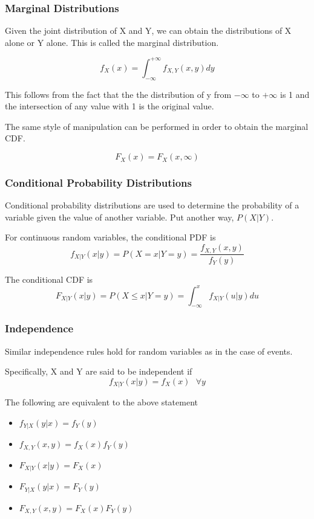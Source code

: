 \subsubsection*{Marginal Distributions}
Given the joint distribution of X and Y, we can obtain the distributions of X alone or Y alone. This is called the marginal distribution.

\[
    f_X(x) = \int_{-\infty}^{+\infty}f_{X, Y}(x, y)dy
\]

This follows from the fact that the the distribution of y from $-\infty$ to $+\infty$ is 1 and the intersection of any value with 1 is the original value. 

The same style of manipulation can be performed in order to obtain the marginal CDF.

\[
    F_X(x) = F_X(x, \infty)
\]

\subsubsection*{Conditional Probability Distributions}
Conditional probability distributions are used to determine the probability of a variable given the value of another variable. Put another way, $P(X | Y)$.

For continuous random variables, the conditional PDF is
\[
    f_{X|Y}(x|y) = P(X = x | Y = y) = \frac{f_{X,Y}(x, y)}{f_Y(y)}
\]

The conditional CDF is
\[
    F_{X|Y}(x|y) = P(X \le x | Y = y) = \int_{-\infty}^{x}f_{X|Y}(u|y)du 
\]

\subsubsection*{Independence}
Similar independence rules hold for random variables as in the case of events.

Specifically, X and Y are said to be independent if
\[
    f_{X|Y}(x| y) = f_X(x) \text{   }\forall y
\]

The following are equivalent to the above statement
\begin{itemize}
    \item $f_{Y|X}(y|x) = f_Y(y)$
    \item $f_{X,Y}(x, y) = f_X(x)f_Y(y)$
    \item $F_{X|Y}(x| y) = F_X(x) $
    \item $F_{Y|X}(y|x) = F_Y(y)$
    \item $F_{X,Y}(x, y) = F_X(x)F_Y(y)$
\end{itemize}


